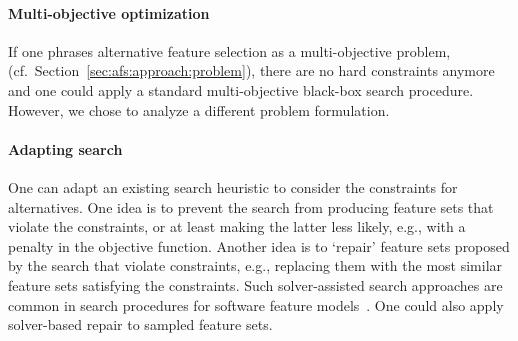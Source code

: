 \documentclass{article}
\theoremstyle{definition}
\begin{document}
\paragraph{Multi-objective optimization}

If one phrases alternative feature selection as a multi-objective problem, (cf.~Section~\ref{sec:afs:approach:problem}), there are no hard constraints anymore and one could apply a standard multi-objective black-box search procedure.
However, we chose to analyze a different problem formulation.

\paragraph{Adapting search}

One can adapt an existing search heuristic to consider the constraints for alternatives.
One idea is to prevent the search from producing feature sets that violate the constraints, or at least making the latter less likely, e.g., with a penalty in the objective function.
Another idea is to `repair' feature sets proposed by the search that violate constraints, e.g., replacing them with the most similar feature sets satisfying the constraints.
Such solver-assisted search approaches are common in search procedures for software feature models~\cite{guo2018preserve, henard2015combining, white2010automated}.
One could also apply solver-based repair to sampled feature sets.
\end{document}
